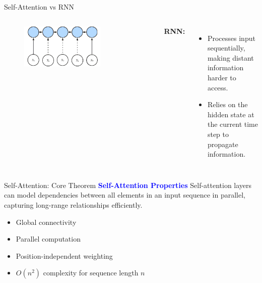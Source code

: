 \documentclass[serif, aspectratio=169]{beamer}
\begin{document}
\begin{frame}{Self-Attention vs RNN}
\begin{columns}
		\begin{figure}
			\centering
			\includegraphics[width=0.7\textwidth]{pic/rnn-1.jpg}
		\end{figure}
		\textbf{RNN:}
		\begin{itemize}
			\item Processes input sequentially, making distant information harder to access.
			\item Relies on the hidden state at the current time step to propagate information.
		\end{itemize}
	\end{columns}

\end{frame}

\begin{frame}{Self-Attention: Core Theorem}
    \textcolor{blue}{\textbf{Self-Attention Properties}}
    \newline
        Self-attention layers can model dependencies between all elements in an input sequence in parallel, capturing long-range relationships efficiently.

    \begin{itemize}
            \item Global connectivity
            \item Parallel computation
            \item Position-independent weighting
            \item $O(n^2)$ complexity for sequence length $n$
    \end{itemize}
\end{frame}
\end{document}

